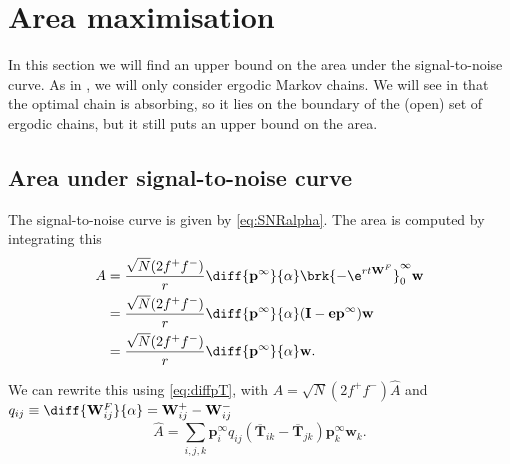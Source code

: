 \documentclass[12pt]{article}
\newcommand{\I}{\mathbf{I}}
\newcommand{\onev}{\mathbf{e}}
\newcommand{\eq}{\mathbf{p}^\infty}
\newcommand{\fpt}{\mathbf{T}}
\newcommand{\fptb}{\overline{\fpt}}
\newcommand{\w}{\mathbf{w}}
\newcommand{\W}{\mathbf{W}}
\DeclareMathOperator{\SNR}{SNR}
\begin{document}
\section{Area maximisation}\label{sec:areamax}

In this section we will find an upper bound on the area under the signal-to-noise curve.
As in , we will only consider ergodic Markov chains.
We will see in  that the optimal chain is absorbing, so it lies on the boundary of the (open) set of ergodic chains, but it still puts an upper bound on the area.

\subsection{Area under signal-to-noise curve}\label{sec:area}

The signal-to-noise curve is given by \eqref{eq:SNRalpha}.
The area is computed by integrating this
%
\begin{equation}\label{eq:area}
\begin{aligned}
  A &= \frac{\sqrt{N}(2f^+f^-)}{r} \diff{\eq}{\alpha} \brk{-\e^{rt\W^F}}_0^\infty \w \\
    &= \frac{\sqrt{N}(2f^+f^-)}{r} \diff{\eq}{\alpha} (\I-\onev\eq) \w \\
    &= \frac{\sqrt{N}(2f^+f^-)}{r} \diff{\eq}{\alpha} \w.
\end{aligned}
\end{equation}
%

We can rewrite this using \eqref{eq:diffpT}, with $A=\sqrt{N}(2f^+f^-)\hat{A}$ and $q_{ij} \equiv \diff{\W^F_{ij}}{\alpha}=\W^+_{ij}-\W^-_{ij}$
%
\begin{equation}\label{eq:areaT}
  \hat{A} = \sum_{i,j,k} \eq_i q_{ij} (\fptb_{ik} - \fptb_{jk}) \eq_k \w_k.
\end{equation}
%
\end{document}
